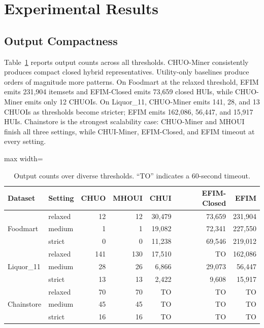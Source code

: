 \documentclass[11pt,a4paper]{article}
\begin{document}
\section{Experimental Results}

\subsection{Output Compactness}

Table~\ref{tab:outputs} reports output counts across all thresholds. CHUO-Miner consistently produces compact closed hybrid representatives. Utility-only baselines produce orders of magnitude more patterns. On Foodmart at the relaxed threshold, EFIM emits 231,904 itemsets and EFIM-Closed emits 73,659 closed HUIs, while CHUO-Miner emits only 12 CHUOIs. On Liquor\_11, CHUO-Miner emits 141, 28, and 13 CHUOIs as thresholds become stricter; EFIM emits 162,086, 56,447, and 15,917 HUIs. Chainstore is the strongest scalability case: CHUO-Miner and MHOUI finish all three settings, while CHUI-Miner, EFIM-Closed, and EFIM timeout at every setting.

\begin{table}[H]
\centering
\caption{Output counts over diverse thresholds. ``TO'' indicates a 60-second timeout.}
\label{tab:outputs}
\small
\begin{adjustbox}{max width=\textwidth}
\begin{tabular}{llrrrrr}
\toprule
Dataset & Setting & CHUO & MHOUI & CHUI & EFIM-Closed & EFIM \\
\midrule
\multirow{3}{*}{Foodmart}
& relaxed & 12 & 12 & 30,479 & 73,659 & 231,904 \\
& medium & 1 & 1 & 19,082 & 72,341 & 227,550 \\
& strict & 0 & 0 & 11,238 & 69,546 & 219,012 \\
\midrule
\multirow{3}{*}{Liquor\_11}
& relaxed & 141 & 130 & 17,510 & TO & 162,086 \\
& medium & 28 & 26 & 6,866 & 29,073 & 56,447 \\
& strict & 13 & 13 & 2,422 & 9,608 & 15,917 \\
\midrule
\multirow{3}{*}{Chainstore}
& relaxed & 70 & 70 & TO & TO & TO \\
& medium & 45 & 45 & TO & TO & TO \\
& strict & 16 & 16 & TO & TO & TO \\
\bottomrule
\end{tabular}
\end{adjustbox}
\end{table}
\end{document}
